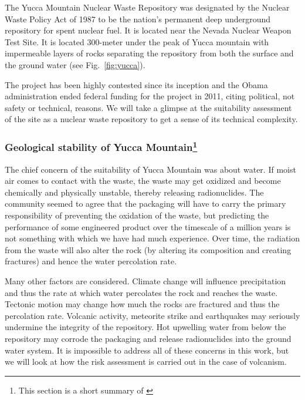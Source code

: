 \documentclass[nofootinbib,preprint,aps]{revtex4-1}
\begin{document}
        The Yucca Mountain Nuclear Waste Repository was designated by the Nuclear Waste Policy Act
        of 1987 to be the nation's permanent deep underground repository for spent nuclear fuel. It is
        located near the Nevada Nuclear Weapon Test Site.
        It is located 300-meter under the peak of Yucca mountain with impermeable layers of rocks
        separating the repository
        from both the surface and the ground water (see Fig.~\ref{fig:yucca}).

        The project has been highly contested since its
        inception and the Obama administration ended federal funding for the project in 2011, citing political,
        not safety or technical, reasons. We will take a glimpse at the suitability assessment of the site
        as a nuclear waste repository to get a sense of its technical complexity.

        \subsubsection{Geological stability of Yucca Mountain\footnote{This section is a short summary of \cite{m06}}}
        The chief concern of the suitability of Yucca Mountain was about water. If moist air comes to
        contact with the waste, the waste may get oxidized and become chemically and physically unstable, thereby
        releasing radionuclides.
        The community seemed to agree that the packaging will have to carry the primary
        responsibility of preventing the oxidation of the waste, but predicting the performance of some
        engineered product over the timescale of a million years is not something with which we have had much 
        experience. Over time, the radiation from the waste will also alter the rock (by altering its composition
        and creating fractures) and hence the water percolation rate.

        Many other factors are considered. Climate change will influence precipitation and thus the
        rate at which water percolates the rock and reaches the waste. 
        Tectonic motion may change how much the rocks are fractured and thus the percolation rate.
        Volcanic activity, meteorite strike and earthquakes may seriously undermine the integrity of the repository.
        Hot upwelling water from below the repository may corrode the packaging and release radionuclides into
        the ground water system. It is impossible to address all of these concerns in this work, but we will look
        at how the risk assessment is carried out in the case of volcanism.
\end{document}
